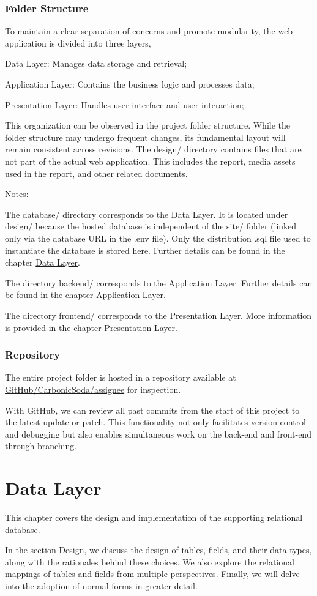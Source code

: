 \documentclass[12pt]{report}
\newcommand{\n}{\par}
\newcommand{\br}{\vspace{1 em}\n}
\begin{document}
\subsection{Folder Structure} \label{overview.project-structure.folder-structure}
To maintain a clear separation of concerns and promote modularity, the web application is divided into three layers,\n
Data Layer: Manages data storage and retrieval;\n
Application Layer: Contains the business logic and processes data;\n
Presentation Layer: Handles user interface and user interaction;
\br
This organization can be observed in the project folder structure.
While the folder structure may undergo frequent changes, its fundamental layout will remain consistent across revisions.
\newpage
{}
\vspace{2 em}
The design/ directory contains files that are not part of the actual web application.
This includes the report, media assets used in the report, and other related documents.
\br
Notes:\n
The database/ directory corresponds to the Data Layer.
It is located under design/ because the hosted database is independent of the site/ folder (linked only via the database URL in the .env file).
Only the distribution .sql file used to instantiate the database is stored here.
Further details can be found in the chapter \hyperref[data-layer]{Data Layer}.
\br
The directory backend/ corresponds to the Application Layer.
Further details can be found in the chapter \hyperref[application-layer]{Application Layer}.
\br
The directory frontend/ corresponds to the Presentation Layer.
More information is provided in the chapter \hyperref[presentation-layer]{Presentation Layer}.
\subsection{Repository} \label{overview.project-structure.repository}
The entire project folder is hosted in a repository available at
\href{https://github.com/CarbonicSoda/assignee}{GitHub/Carbonic\-Soda/assignee} for inspection.
\br
With GitHub, we can review all past commits from the start of this project to the latest update or patch.
This functionality not only facilitates version control and debugging but also enables simultaneous work on the back-end and front-end through branching.

\chapter{Data Layer} \label{data-layer}
This chapter covers the design and implementation of the supporting relational database.
\br
In the section \hyperref[data-layer.design]{Design}, we discuss the design of tables, fields, and their data types, along with the rationales behind these choices. We also explore the relational mappings of tables and fields from multiple perspectives. Finally, we will delve into the adoption of normal forms in greater detail.
\br
\end{document}
